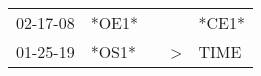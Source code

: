 \begin{supertabular}{lllll}
 02-17-08 &  *OE1* &   &               &  *CE1* \\
 01-25-19 &  *OS1* &   &  \textgreater &   TIME \\
\end{supertabular}

